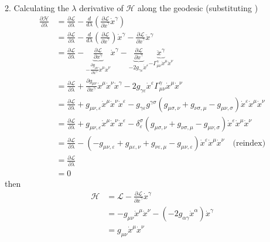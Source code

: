 \documentclass[10pt,a4paper]{book}
\theoremstyle{definition}
\begin{document}
2. Calculating the $\lambda$ derivative of $\mathcal{H}$ along the geodesic (substituting )
\begin{align}
\frac{\partial\mathcal{H}}{\partial\lambda}&=\frac{\partial\mathcal{L}}{\partial\lambda}-\frac{d}{d\lambda}\left(\frac{\partial\mathcal{L}}{\partial\dot{x}^\gamma}\dot{x}^\gamma\right)\\
&=\frac{\partial\mathcal{L}}{\partial\lambda}-\frac{d}{d\lambda}\left(\frac{\partial\mathcal{L}}{\partial\dot{x}^\gamma}\right)\dot{x}^\gamma-\frac{\partial\mathcal{L}}{\partial\dot{x}^\gamma}\ddot{x}^\gamma\\
&=\frac{\partial\mathcal{L}}{\partial\lambda}-\underbrace{\frac{\partial\mathcal{L}}{\partial x^\gamma}}_{-\frac{\partial g_{\mu\nu}}{\partial x^\gamma}\dot{x}^\mu\dot{x}^\nu}\dot{x}^\gamma
-\underbrace{\frac{\partial\mathcal{L}}{\partial\dot{x}^\gamma}}_{-2g_{\gamma\varepsilon}\dot{x}^\varepsilon}\underbrace{\ddot{x}^\gamma}_{-\Gamma^\gamma_{\mu\nu}\dot{x}^\mu\dot{x}^\nu}\\
&=\frac{\partial\mathcal{L}}{\partial\lambda}+\frac{\partial g_{\mu\nu}}{\partial x^\gamma}\dot{x}^\mu\dot{x}^\nu\dot{x}^\gamma-2g_{\gamma\varepsilon}\dot{x}^\varepsilon \Gamma^\gamma_{\mu\nu}\dot{x}^\mu\dot{x}^\nu\\
&=\frac{\partial\mathcal{L}}{\partial\lambda}+g_{\mu\nu,\varepsilon}\dot{x}^\mu\dot{x}^\nu\dot{x}^\varepsilon-g_{\gamma\varepsilon}g^{\gamma\sigma}(g_{\mu\sigma,\nu}+g_{\nu\sigma,\mu}-g_{\mu\nu,\sigma})\dot{x}^\varepsilon \dot{x}^\mu\dot{x}^\nu\\
&=\frac{\partial\mathcal{L}}{\partial\lambda}+g_{\mu\nu,\varepsilon}\dot{x}^\mu\dot{x}^\nu\dot{x}^\varepsilon-\delta_\varepsilon^\sigma(g_{\mu\sigma,\nu}+g_{\nu\sigma,\mu}-g_{\mu\nu,\sigma})\dot{x}^\varepsilon \dot{x}^\mu\dot{x}^\nu\\
&=\frac{\partial\mathcal{L}}{\partial\lambda}-(-g_{\mu\nu,\varepsilon}+g_{\mu\varepsilon,\nu}+g_{\nu\varepsilon,\mu}-g_{\mu\nu,\varepsilon})\dot{x}^\varepsilon \dot{x}^\mu\dot{x}^\nu\quad\text{(reindex)}\\
&=\frac{\partial\mathcal{L}}{\partial\lambda}\\
&=0
\end{align}
then
\begin{align}
\mathcal{H}&=\mathcal{L}-\frac{\partial\mathcal{L}}{\partial\dot{x}^\gamma}\dot{x}^\gamma\\
&=-g_{\mu\nu}\dot{x}^\mu\dot{x}^\nu-(-2g_{\alpha\gamma}\dot{x}^\alpha)\dot{x}^\gamma\\
&=g_{\mu\nu}\dot{x}^\mu\dot{x}^\nu
\end{align}
\end{document}
